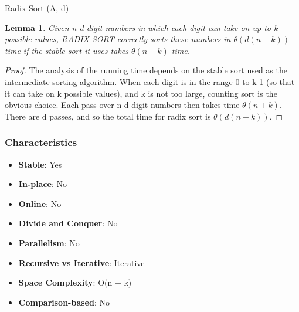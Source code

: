 \begin{algorithm}
    \caption{Radix Sort (A, d)}
\end{algorithm}
\newpage
\newtheorem{Lemma}{Lemma}
\begin{Lemma}
    Given n d-digit numbers in which each digit can take on up to k possible values,
    RADIX-SORT correctly sorts these numbers in $\theta(d(n+k))$ time if the stable sort
    it uses takes $\theta(n+k)$ time.\end{Lemma}
\begin{proof}
    The analysis of the running time depends on the stable
    sort used as the intermediate sorting algorithm. When each digit is in the range 0
    to k 1 (so that it can take on k possible values), and k is not too large, counting sort
    is the obvious choice. Each pass over n d-digit numbers then takes time $\theta(n+k)$.
    There are d passes, and so the total time for radix sort is $\theta(d(n+k))$.
\end{proof}

\subsubsection*{Characteristics}

\begin{itemize}
    \item \textbf{Stable}: Yes
    \item \textbf{In-place}: No
    \item \textbf{Online}: No
    \item \textbf{Divide and Conquer}: No
    \item \textbf{Parallelism}: No
    \item \textbf{Recursive vs Iterative}: Iterative
    \item \textbf{Space Complexity}: O(n + k)
    \item \textbf{Comparison-based}: No 
\end{itemize}

